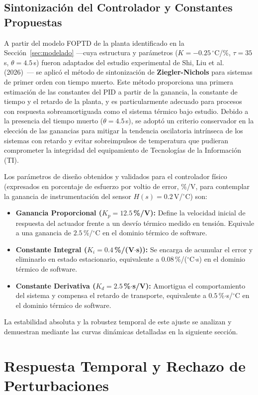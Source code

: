 \documentclass[journal,twocolumn]{IEEEtran}
\begin{document}
\subsection{Sintonización del Controlador y Constantes Propuestas}
A partir del modelo FOPTD de la planta identificado en la Sección~\ref{sec:modelado} —cuya estructura y parámetros ($K = -0.25$\,$^\circ$C/\%, $\tau = 35$\,s, $\theta = 4.5$\,s) fueron adaptados del estudio experimental de Shi, Liu et al. (2026)~\cite{liu2026}— se aplicó el método de sintonización de \textbf{Ziegler-Nichols} para sistemas de primer orden con tiempo muerto. Este método proporciona una primera estimación de las constantes del PID a partir de la ganancia, la constante de tiempo y el retardo de la planta, y es particularmente adecuado para procesos con respuesta sobreamortiguada como el sistema térmico bajo estudio. Debido a la presencia del tiempo muerto ($\theta = 4.5$\,s), se adoptó un criterio conservador en la elección de las ganancias para mitigar la tendencia oscilatoria intrínseca de los sistemas con retardo y evitar sobreimpulsos de temperatura que pudieran comprometer la integridad del equipamiento de Tecnologías de la Información (TI).

Los parámetros de diseño obtenidos y validados para el controlador físico (expresados en porcentaje de esfuerzo por voltio de error, \%/V, para contemplar la ganancia de instrumentación del sensor $H(s) = 0.2$\,V/$^\circ$C) son:
\begin{itemize}
    \item \textbf{Ganancia Proporcional ($K_p = 12.5$\,\%/V):} Define la velocidad inicial de respuesta del actuador frente a un desvío térmico medido en tensión. Equivale a una ganancia de $2.5$\,\%/$^\circ$C en el dominio térmico de software.
    \item \textbf{Constante Integral ($K_i = 0.4$\,\%/(V$\cdot$s)):} Se encarga de acumular el error y eliminarlo en estado estacionario, equivalente a $0.08$\,\%/($^\circ$C$\cdot$s) en el dominio térmico de software.
    \item \textbf{Constante Derivativa ($K_d = 2.5$\,\%$\cdot$s/V):} Amortigua el comportamiento del sistema y compensa el retardo de transporte, equivalente a $0.5$\,\%$\cdot$s/$^\circ$C en el dominio térmico de software.
\end{itemize}
La estabilidad absoluta y la robustez temporal de este ajuste se analizan y demuestran mediante las curvas dinámicas detalladas en la siguiente sección.

\section{Respuesta Temporal y Rechazo de Perturbaciones}
\end{document}
